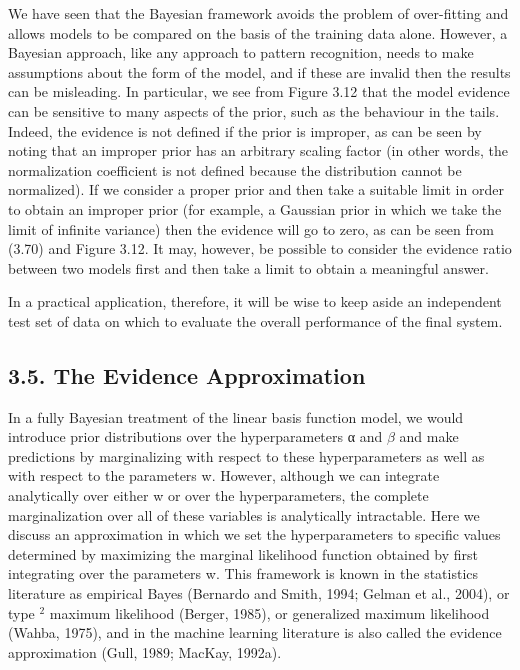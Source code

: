 \documentclass[
  10
]{article}
\begin{document}
We have seen that the Bayesian framework avoids the problem of
over-fitting and allows models to be compared on the basis of the
training data alone. However, a Bayesian approach, like any approach to
pattern recognition, needs to make assumptions about the form of the
model, and if these are invalid then the results can be misleading. In
particular, we see from Figure 3.12 that the model evidence can be
sensitive to many aspects of the prior, such as the behaviour in the
tails. Indeed, the evidence is not defined if the prior is improper, as
can be seen by noting that an improper prior has an arbitrary scaling
factor (in other words, the normalization coefficient is not defined
because the distribution cannot be normalized). If we consider a proper
prior and then take a suitable limit in order to obtain an improper
prior (for example, a Gaussian prior in which we take the limit of
infinite variance) then the evidence will go to zero, as can be seen
from (3.70) and Figure 3.12. It may, however, be possible to consider
the evidence ratio between two models first and then take a limit to
obtain a meaningful answer.

In a practical application, therefore, it will be wise to keep aside an
independent test set of data on which to evaluate the overall
performance of the final system.

\subsection{3.5. The Evidence
Approximation}\label{the-evidence-approximation}

In a fully Bayesian treatment of the linear basis function model, we
would introduce prior distributions over the hyperparameters α and
\(\beta\) and make predictions by marginalizing with respect to these
hyperparameters as well as with respect to the parameters w. However,
although we can integrate analytically over either w or over the
hyperparameters, the complete marginalization over all of these
variables is analytically intractable. Here we discuss an approximation
in which we set the hyperparameters to specific values determined by
maximizing the marginal likelihood function obtained by first
integrating over the parameters w. This framework is known in the
statistics literature as empirical Bayes (Bernardo and Smith, 1994;
Gelman et al., 2004), or type \(^ 2\) maximum likelihood (Berger, 1985),
or generalized maximum likelihood (Wahba, 1975), and in the machine
learning literature is also called the evidence approximation (Gull,
1989; MacKay, 1992a).
\end{document}
